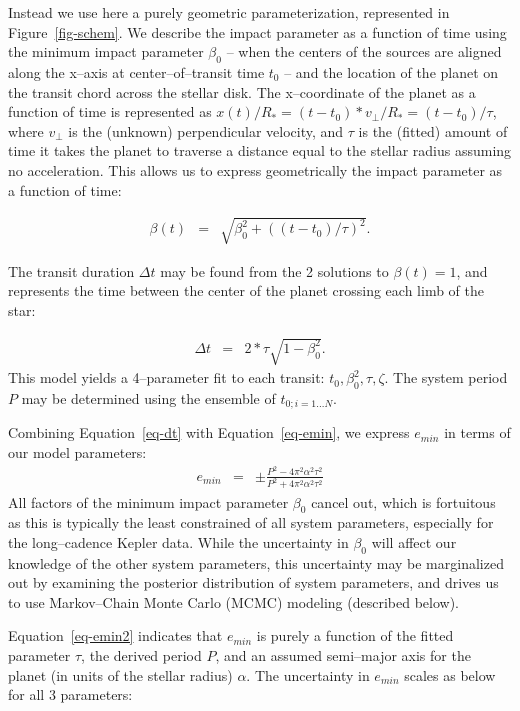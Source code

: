 Instead we use here a purely geometric parameterization, represented
in Figure~\ref{fig-schem}.  We describe the impact parameter as a
function of time using the minimum impact parameter $\beta_0$ -- when
the centers of the sources are aligned along the x--axis at
center--of--transit time $t_0$ -- and the location of the planet on
the transit chord across the stellar disk.  The x--coordinate of the
planet as a function of time is represented as $x(t) / R_* = (t - t_0)
* v_\perp / R_* = (t - t_0) / \tau$, where $v_\perp$ is the (unknown)
perpendicular velocity, and $\tau$ is the (fitted) amount of time it
takes the planet to traverse a distance equal to the stellar radius
assuming no acceleration.  This allows us to express geometrically the
impact parameter as a function of time:

\begin{eqnarray}
\beta(t) & = & \sqrt{\beta_0^2 + \left((t - t_0) / \tau\right)^2}.
\end{eqnarray}

The transit duration $\Delta t$ may be found from the 2 solutions to
$\beta(t) = 1$, and represents the time between the center of the
planet crossing each limb of the star:

\begin{eqnarray}
\Delta t & = & 2 * \tau \sqrt{1 - \beta_0^2}.
\label{eq-dt}
\end{eqnarray}
This model yields a 4--parameter fit to each transit: $t_0, \beta_0^2,
\tau, \zeta$.  The system period $P$ may be determined using the
ensemble of $t_{0;i=1...N}$.

Combining Equation~\ref{eq-dt} with Equation~\ref{eq-emin}, we express
$e_{min}$ in terms of our model parameters:
\begin{eqnarray}
e_{min} & = & \pm \frac{P^{2} - 4 \pi^{2} \alpha^{2} \tau^{2}}{P^{2} + 4 \pi^{2} \alpha^{2} \tau^{2}}
\label{eq-emin2}
\end{eqnarray}
All factors of the minimum impact parameter $\beta_0$ cancel out,
which is fortuitous as this is typically the least constrained of all
system parameters, especially for the long--cadence Kepler data.
While the uncertainty in $\beta_0$ will affect our knowledge of the
other system parameters, this uncertainty may be marginalized out by
examining the posterior distribution of system parameters, and drives
us to use Markov--Chain Monte Carlo (MCMC) modeling (described
below).

Equation~\ref{eq-emin2} indicates that $e_{min}$ is purely a function
of the fitted parameter $\tau$, the derived period $P$, and an assumed
semi--major axis for the planet (in units of the stellar radius)
$\alpha$.  The uncertainty in $e_{min}$ scales as below for all 3
parameters:


